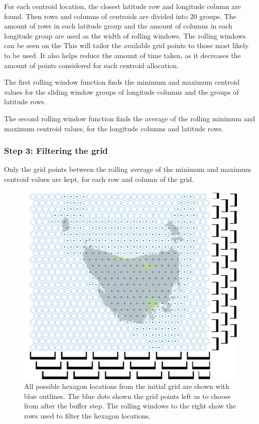 \documentclass[
]{jss}
\begin{document}
For each centroid location, the closest latitude row and longitude
column are found. Then rows and columns of centroids are divided into 20
groups. The amount of rows in each latitude group and the amount of
columns in each longitude group are used as the width of rolling
windows. The rolling windows can be seen on the This will tailor the
available grid points to those most likely to be used. It also helps
reduce the amount of time taken, as it decreases the amount of points
considered for each centroid allocation.

The first rolling window function finds the minimum and maximum centroid
values for the sliding window groups of longitude columns and the groups
of latitude rows.

The second rolling window function finds the average of the rolling
minimum and maximum centroid values, for the longitude columns and
latitude rows.

\hypertarget{step-3-filtering-the-grid}{%
\subsubsection{Step 3: Filtering the
grid}\label{step-3-filtering-the-grid}}

Only the grid points between the rolling average of the minimum and
maximum centroid values are kept, for each row and column of the grid.

\begin{CodeChunk}
\begin{figure}

{\centering \includegraphics[width=1\linewidth]{figures/3grid} 

}

\caption[All possible hexagon locations from the initial grid are shown with blue outlines]{All possible hexagon locations from the initial grid are shown with blue outlines. The blue dots shown the grid points left as to choose from after the buffer step. The rolling windows to the right show the rows used to filter the hexagon locations.}\label{fig:filter_grid}
\end{figure}
\end{CodeChunk}
\end{document}
